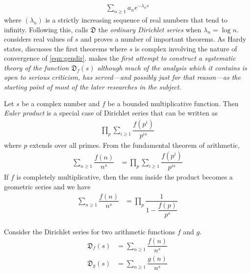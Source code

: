 \documentclass[elemannt.tex]{subfile}
\begin{document}
		\begin{align}
			\sum_{n\geq 1}a_{n}e^{-\lambda_{n}s}\label{eqn:gendir}
		\end{align}
	where $(\lambda_{n})$ is a strictly increasing sequence of real numbers that tend to infinity. Following this, \textcite{hardy_riesz_1915} calls $\mathfrak{D}$ the \textit{ordinary Dirichlet series} when $\lambda_{n}=\log{n}$. \textcite{lejeune_1879} considers real values of $s$ and proves a number of important theorems. As Hardy states, \textcite{jensen_1884,jensen_1888} discusses the first theorems where $s$ is complex involving the nature of convergence of \ref{eqn:gendir}. \textcite{cahen_1894} makes the \textit{first attempt to construct a systematic theory of the function $\mathfrak{D}_{f}(s)$ although much of the analysis which it contains is open to serious criticism, has served---and possibly just for that reason---as the starting point of most of the later researches in the subject.}
		\begin{definition}\label{def:euler-product}
			Let $s$ be a complex number and $f$ be a bounded multiplicative function. Then \textit{Euler product} is a special case of Dirichlet series that can be written as
				\begin{align*}
					\prod_{p}\sum_{i\geq 1}\dfrac{f(p^{i})}{p^{is}}
				\end{align*}
			where $p$ extends over all primes. From the fundamental theorem of arithmetic,
				\begin{align*}
					\sum_{n\geq 1}\dfrac{f(n)}{n^{s}}
						& = \prod_{p}\sum_{i\geq 1}\dfrac{f(p^{i})}{p^{is}}
				\end{align*}
			If $f$ is completely multiplicative, then the sum inside the product becomes a geometric series and we have
				\begin{align*}
					\sum_{n\geq 1}\dfrac{f(n)}{n^{s}}
						& = \prod_{p}\dfrac{1}{1-\dfrac{f(p)}{p^{s}}}
				\end{align*}
		\end{definition}
	Consider the Dirichlet series for two arithmetic functions $f$ and $g$.
		\begin{align*}
			\mathfrak{D}_{f}(s)
				& = \sum_{n\geq 1}\dfrac{f(n)}{n^{s}}\\
			\mathfrak{D}_{g}(s)
				& = \sum_{n\geq 1}\dfrac{g(n)}{n^{s}}
		\end{align*}
\end{document}
